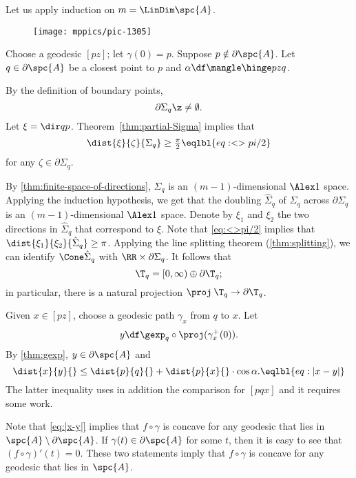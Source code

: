 Let us apply induction on $m=\LinDim \spc{A}$.

\begin{wrapfigure}{r}{30mm}
\vskip-2mm
\centering
\texttt{[image: mppics/pic-1305]}
\end{wrapfigure}

Choose a geodesic $[pz]$; let $\gamma(0)=p$.
Suppose $p\notin\partial \spc{A}$.
Let $q\in \partial\spc{A}$ be a closest point to $p$ and $\alpha\df\mangle\hinge pzq$.

By the definition of boundary points, 
\[\partial \Sigma_q\z\ne\emptyset.\]
Let $\xi=\dir qp$.
Theorem~\ref{thm:partial-Sigma} implies that 
\[\dist{\xi}{\zeta}{\Sigma_q}\ge \tfrac\pi2
\eqlbl{eq:<>pi/2}\]
for any $\zeta\in\partial\Sigma_q$.

By \ref{thm:finite-space-of-directions}, $\Sigma_q$ is an $(m-1)$-dimensional $\Alex1$ space.
Applying the induction hypothesis, we get that the doubling $\hat\Sigma_q$ of $\Sigma_q$ across $\partial \Sigma_q$ is an $(m-1)$-dimensional $\Alex1$ space.
Denote by $\xi_1$ and $\xi_2$ the two directions in $\hat\Sigma_q$ that correspond to $\xi$.
Note that \ref{eq:<>pi/2} implies that $\dist{\xi_1}{\xi_2}{\hat\Sigma_q}\ge \pi$.
Applying the line splitting theorem (\ref{thm:splitting}), we can identify 
$\Cone\hat\Sigma_q$ with $\RR\times \partial\Sigma_q$.
It follows that 
\[\T_q=[0,\infty)\oplus \partial\T_q;\]
in particular, there is a natural projection $\proj\:\T_q\to \partial\T_q$.

Given $x\in [pz]$, choose a geodesic path $\gamma_x$ from $q$ to $x$.
Let 
\[y
\df
\gexp_q\circ\proj(\gamma^+_x(0)).\]
By \ref{thm:gexp}, $y\in \partial\spc{A}$ and 
\[\dist{x}{y}{}\le \dist{p}{q}{}+\dist{p}{x}{}\cdot \cos\alpha.\eqlbl{eq:|x-y|}\]
The latter inequality uses in addition the comparison for $[pqx]$ and it requires some work.

Note that \ref{eq:|x-y|} implies that $f\circ\gamma$ is concave for any geodesic that lies in $\spc{A}\setminus \partial \spc{A}$.
If $\gamma(t)\in \partial \spc{A}$ for some $t$, then it is easy to see that $(f\circ\gamma)'(t)=0$.
These two statements imply that $f\circ\gamma$ is concave for any geodesic that lies in $\spc{A}$.
















